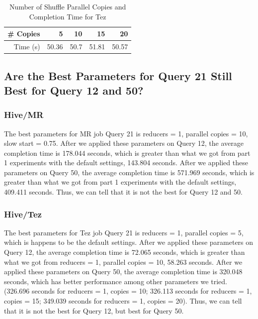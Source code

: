 \documentclass[10pt]{article}
\begin{document}
\begin{table}[htbp]
  \centering
  \caption{Number of Shuffle Parallel Copies and Completion Time for Tez}
    \begin{tabular}{rrrrr}
    \toprule
    \# Copies & 5     & 10    & 15    & 20 \\
    \midrule
    Time (s) & 50.36 & 50.7  & 51.81 & 50.57 \\
    \bottomrule
    \end{tabular}%
  \label{tab:num_shuffle_parallel_tez}%
\end{table}%


\subsection{Are the Best Parameters for Query 21 Still Best for Query 12 and 50?}

\subsubsection{Hive/MR}

The best parameters for MR job Query 21 is reducers = 1, parallel copies = 10, slow start = 0.75. After we applied these parameters on Query 12, the average completion time is 178.044 seconds, which is greater than what we got from part 1 experiments with the default settings, 143.804 seconds. After we applied these parameters on Query 50, the average completion time is 571.969 seconds, which is greater than what we got from part 1 experiments with the default settings, 409.411 seconds. Thus, we can tell that it is not the best for Query 12 and 50.


\subsubsection{Hive/Tez}

The best parameters for Tez job Query 21 is reducers = 1, parallel copies = 5, which is happens to be the default settings. After we applied these parameters on Query 12, the average completion time is 72.065 seconds, which is greater than what we got from reducers = 1, parallel copies = 10, 58.263 seconds. After we applied these parameters on Query 50, the average completion time is 320.048 seconds, which has better performance among other parameters we tried. (326.696 seconds for reducers = 1, copies = 10; 326.113 seconds for reducers = 1, copies = 15; 349.039 seconds for reducers = 1, copies = 20). Thus, we can tell that it is not the best for Query 12, but best for Query 50.
\end{document}
